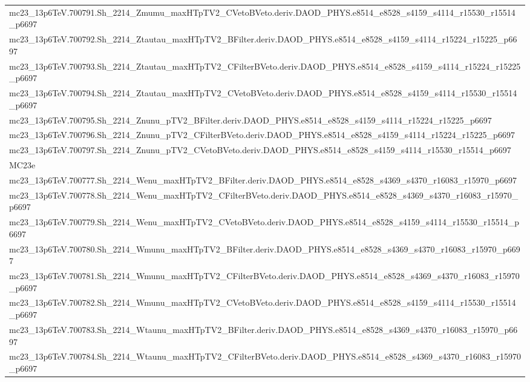 \begin{table}[ht]
\begin{tabular}{l}
mc23\_13p6TeV.700791.Sh\_2214\_Zmumu\_maxHTpTV2\_CVetoBVeto.deriv.DAOD\_PHYS.e8514\_e8528\_s4159\_s4114\_r15530\_r15514\_p6697 \\
mc23\_13p6TeV.700792.Sh\_2214\_Ztautau\_maxHTpTV2\_BFilter.deriv.DAOD\_PHYS.e8514\_e8528\_s4159\_s4114\_r15224\_r15225\_p6697 \\
mc23\_13p6TeV.700793.Sh\_2214\_Ztautau\_maxHTpTV2\_CFilterBVeto.deriv.DAOD\_PHYS.e8514\_e8528\_s4159\_s4114\_r15224\_r15225\_p6697 \\
mc23\_13p6TeV.700794.Sh\_2214\_Ztautau\_maxHTpTV2\_CVetoBVeto.deriv.DAOD\_PHYS.e8514\_e8528\_s4159\_s4114\_r15530\_r15514\_p6697 \\
mc23\_13p6TeV.700795.Sh\_2214\_Znunu\_pTV2\_BFilter.deriv.DAOD\_PHYS.e8514\_e8528\_s4159\_s4114\_r15224\_r15225\_p6697 \\
mc23\_13p6TeV.700796.Sh\_2214\_Znunu\_pTV2\_CFilterBVeto.deriv.DAOD\_PHYS.e8514\_e8528\_s4159\_s4114\_r15224\_r15225\_p6697 \\
mc23\_13p6TeV.700797.Sh\_2214\_Znunu\_pTV2\_CVetoBVeto.deriv.DAOD\_PHYS.e8514\_e8528\_s4159\_s4114\_r15530\_r15514\_p6697 \\
\midrule
MC23e \\
\midrule
mc23\_13p6TeV.700777.Sh\_2214\_Wenu\_maxHTpTV2\_BFilter.deriv.DAOD\_PHYS.e8514\_e8528\_s4369\_s4370\_r16083\_r15970\_p6697 \\
mc23\_13p6TeV.700778.Sh\_2214\_Wenu\_maxHTpTV2\_CFilterBVeto.deriv.DAOD\_PHYS.e8514\_e8528\_s4369\_s4370\_r16083\_r15970\_p6697 \\
mc23\_13p6TeV.700779.Sh\_2214\_Wenu\_maxHTpTV2\_CVetoBVeto.deriv.DAOD\_PHYS.e8514\_e8528\_s4159\_s4114\_r15530\_r15514\_p6697 \\
mc23\_13p6TeV.700780.Sh\_2214\_Wmunu\_maxHTpTV2\_BFilter.deriv.DAOD\_PHYS.e8514\_e8528\_s4369\_s4370\_r16083\_r15970\_p6697 \\
mc23\_13p6TeV.700781.Sh\_2214\_Wmunu\_maxHTpTV2\_CFilterBVeto.deriv.DAOD\_PHYS.e8514\_e8528\_s4369\_s4370\_r16083\_r15970\_p6697 \\
mc23\_13p6TeV.700782.Sh\_2214\_Wmunu\_maxHTpTV2\_CVetoBVeto.deriv.DAOD\_PHYS.e8514\_e8528\_s4159\_s4114\_r15530\_r15514\_p6697 \\
mc23\_13p6TeV.700783.Sh\_2214\_Wtaunu\_maxHTpTV2\_BFilter.deriv.DAOD\_PHYS.e8514\_e8528\_s4369\_s4370\_r16083\_r15970\_p6697 \\
mc23\_13p6TeV.700784.Sh\_2214\_Wtaunu\_maxHTpTV2\_CFilterBVeto.deriv.DAOD\_PHYS.e8514\_e8528\_s4369\_s4370\_r16083\_r15970\_p6697 \\

\end{tabular}
\end{table}
